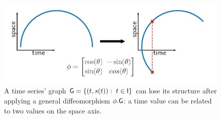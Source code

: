       

\begin{figure}[t]
  \centering
  \includegraphics[width=0.7\linewidth]{"./pictures/diffeo.jpeg"}
  
  \caption{A time series' graph $\mathsf{G}=\{(t,s(t)): \; t\in\mathsf{I}\} $ can lose its structure after applying a general diffeomorphism $\phi.\mathsf{G}$: a time value can be related to two values on the space axis.}
  \label{fig:diffeo}
  
\end{figure}

